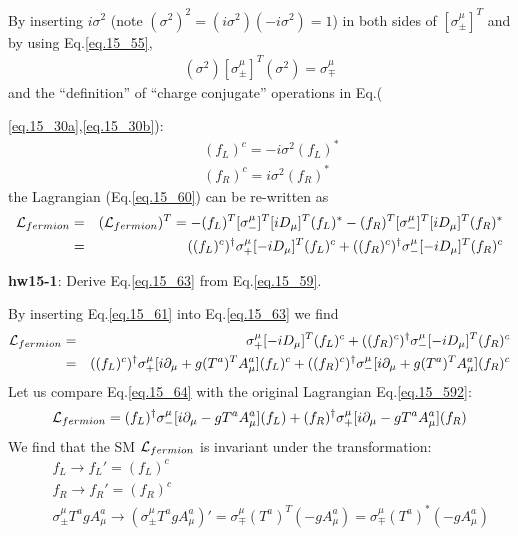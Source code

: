 \documentclass[12pt]{article}
\def\del{{\partial}}
\begin{document}
  By inserting $i\sigma^2$ (note $ (\sigma^2)^2 = (i\sigma^2) (-i\sigma^2)=1$)
  in both sides of $[\sigma_\pm^\mu]^T$ and by using Eq.\ref{eq.15_55},
\begin{eqnarray}
  (\sigma^2) [\sigma_\pm^\mu]^T (\sigma^2) = \sigma_\mp^\mu \label{eq.15_55}
\end{eqnarray}
  and the ``definition'' of ``charge conjugate'' operations in Eq.({\ref{eq.15_30a},\ref{eq.15_30b}):
\begin{eqnarray}
  && (f_L)^c = -i\sigma^2 (f_L)^* \label{eq.15_30a} \\
  && (f_R)^c =  i\sigma^2 (f_R)^* \label{eq.15_30b}
\end{eqnarray}
  the Lagrangian (Eq.\ref{eq.15_60}) can be re-written as
\begin{eqnarray}
  {\cal L}_{fermion} &=& ( {\cal L}_{fermion} )^T
  = - (f_L)^T [\sigma_-^\mu]^T  [iD_\mu]^T  (f_L)^*
    - (f_R)^T [\sigma_-^\mu]^T  [iD_\mu]^T  (f_R)^* \nonumber\\
  &=&   ((f_L)^c)^\dagger \sigma_+^\mu [-iD_\mu]^T (f_L)^c
    + ((f_R)^c)^\dagger \sigma_-^\mu [-iD_\mu]^T (f_R)^c\label{eq.15_63}
\end{eqnarray}

{\bf hw15-1}: Derive Eq.\ref{eq.15_63} from Eq.\ref{eq.15_59}.

  By inserting Eq.\ref{eq.15_61} into Eq.\ref{eq.15_63} we find
\begin{eqnarray}
  {\cal L}_{fermion} &=& \sigma_+^\mu [-iD_\mu]^T (f_L)^c
  + ((f_R)^c)^\dagger \sigma_-^\mu [-iD_\mu]^T (f_R)^c \nonumber \\
  &=& ((f_L)^c)^\dagger \sigma_+^\mu [i\del_\mu +g(T^a)^TA^a_\mu] (f_L)^c
  + ((f_R)^c)^\dagger \sigma_-^\mu [i\del_\mu +g(T^a)^TA^a_\mu] (f_R)^c \label{eq.15_64}
\end{eqnarray}
  Let us compare Eq.\ref{eq.15_64} with the original Lagrangian Eq.\ref{eq.15_592}:
\begin{eqnarray}
  {\cal L}_{fermion}
  = (f_L)^\dagger \sigma_-^\mu [i\del_\mu -g T^a A^a_\mu] (f_L)
  + (f_R)^\dagger \sigma_+^\mu [i\del_\mu -g T^a A^a_\mu] (f_R)\label{eq.15_592}
\end{eqnarray}
  We find that the SM ${\cal L}_{fermion}$ is invariant under the transformation:
\begin{eqnarray}
   &&f_L \to f_L' = (f_L)^c \label{eq.15_65a}\\
    &&f_R \to f_R' = (f_R)^c \label{eq.15_65b}\\
   &&\sigma_\pm^\mu T^a gA^a_\mu
    \to (\sigma_\pm^\mu T^a gA^a_\mu)'
    =  \sigma_\mp^\mu (T^a)^T (-gA^a_\mu)
    =  \sigma_\mp^\mu (T^a)^* (-gA^a_\mu) \label{eq.15_65c}
\end{eqnarray}

}
\end{document}
